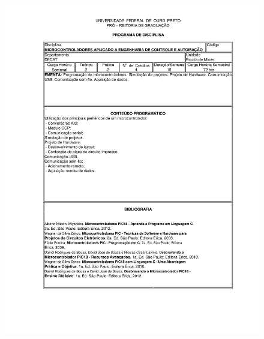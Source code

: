 \begin{figure}[p]
	\centering 
	\includegraphics[scale=0.7]{capitulos/anexo1-programas-disciplina/eg17.pdf}
\end{figure}

